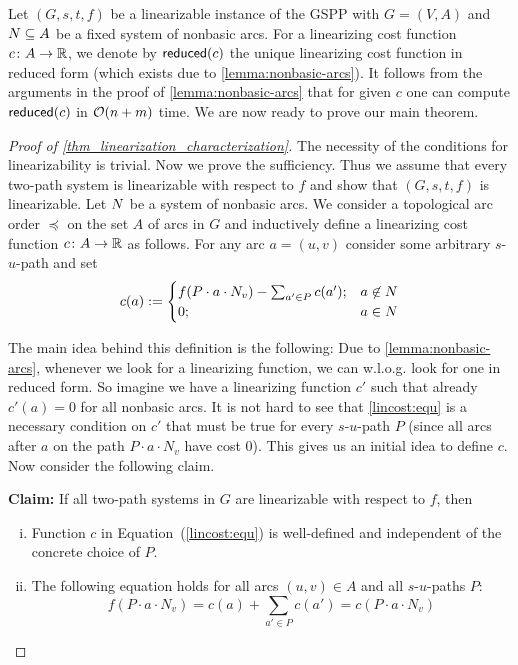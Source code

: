 Let $(G,s,t,f)$ be a linearizable  instance of the GSPP with $G=(V,A)$ and $N\subseteq A$ be a fixed system of nonbasic arcs. For a  linearizing cost function $c \colon A \rightarrow \mathbb{R}$, we denote by $\operatorname{\textsf{reduced}}(c)$ the unique linearizing cost function  in reduced form (which exists due to \cref{lemma:nonbasic-arcs}). 
It follows from the arguments in the proof of  \cref{lemma:nonbasic-arcs} that for given $c$ one can compute $\operatorname{\textsf{reduced}}(c)$ in $\mathcal{O}(n +m)$ time. We are now ready to prove our main theorem.
\begin{proof}[Proof of \cref{thm_linearization_characterization}]
The necessity of the conditions for linearizability is trivial.
Now we prove the sufficiency.
Thus we  assume that every two-path system is linearizable with respect to $f$ and show that $(G,s,t,f)$ is linearizable. Let $N$ be a system of nonbasic arcs. 
    We consider a topological arc order $\preceq$ on the set  $A$ of arcs in $G$ and inductively define a linearizing cost function $c \colon A \rightarrow \mathbb{R}$ as follows. 
    For any arc $a = (u,v)$ consider some arbitrary $s$-$u$-path and set
        \begin{equation}\label{lincost:equ} c(a) := \begin{cases}
        f(P \cdot a \cdot N_v) - \sum_{a' \in P}c(a'); 
        & a \not\in \Nscript \\
        0%
        ; & a \in \Nscript
        \end{cases}
        \end{equation}
   \smallskip

   The main idea behind this definition is the following: Due to \cref{lemma:nonbasic-arcs}, whenever we look for a linearizing function, we can w.l.o.g. look for one in reduced form. So imagine we have a linearizing function $c'$ such that already $c'(a) =  0$ for all nonbasic arcs. It is not hard to see that \cref{lincost:equ} is a necessary condition on $c'$ that must be true for every $s$-$u$-path $P$ (since all arcs after $a$ on the path $P \cdot a \cdot N_v$ have cost 0). This gives us an initial idea to define $c$. Now consider the following claim.
   
   \textbf{Claim:} If all two-path systems in $G$ are linearizable with respect to $f$, then 
   \begin{enumerate}[(i)]
       \item Function $c$ in Equation~(\ref{lincost:equ}) is well-defined and independent of the concrete choice of $P$.
       \item The following equation holds for all arcs $(u,v) \in A$ and all $s$-$u$-paths $P$:
    \begin{equation}\label{claim2:equ} f(P \cdot a \cdot N_v)=c(a)+\sum_{a' \in P} c(a') = c(P \cdot a \cdot N_v)\end{equation}
   \end{enumerate}
    

\end{proof}
